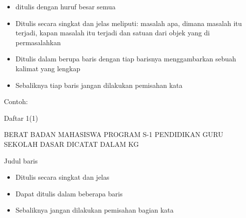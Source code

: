 \begin{itemize}
\vspace{\baselineskip}
	\item ditulis dengan huruf besar semua\par
\vspace{\baselineskip}
	\item Ditulis secara singkat dan jelas meliputi: masalah apa, dimana masalah itu terjadi, kapan masalah itu terjadi dan satuan dari objek yang di permasalahkan\par
\vspace{\baselineskip}
	\item Ditulis dalam berupa baris dengan tiap barisnya menggambarkan sebuah kalimat yang lengkap\par
\vspace{\baselineskip}
	\item Sebaliknya tiap baris jangan dilakukan pemisahan kata
\end{itemize}\par
\vspace{\baselineskip}
\vspace{\baselineskip}

\noindent Contoh:\par


\noindent Daftar 1(1)\par

\vspace{\baselineskip}

\noindent BERAT BADAN MAHASISWA PROGRAM S-1 PENDIDIKAN GURU SEKOLAH DASAR DICATAT DALAM KG\par

\vspace{\baselineskip}
\noindent Judul baris\par

\begin{itemize}
\vspace{\baselineskip}
	\item Ditulis secara singkat dan jelas \par
\vspace{\baselineskip}
	\item Dapat ditulis dalam beberapa baris\par
\vspace{\baselineskip}
	\item Sebaliknya jangan dilakukan pemisahan bagian kata
\end{itemize}\par

